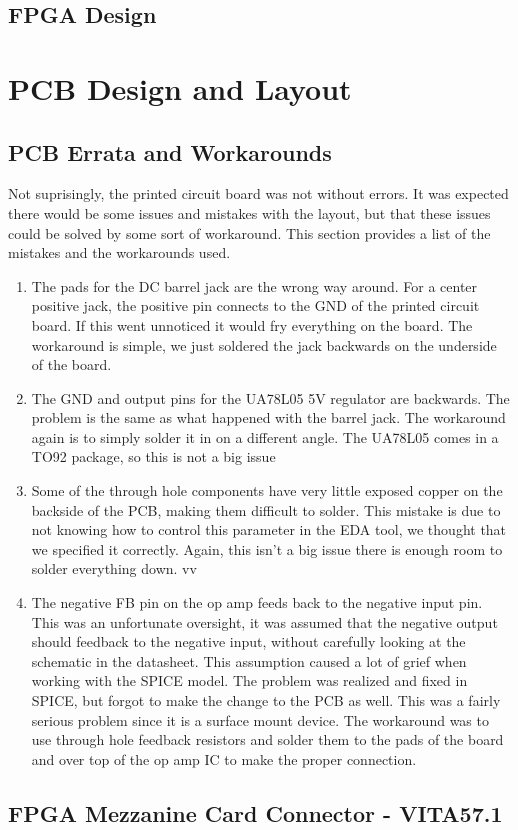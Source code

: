 \documentclass[a4paper, 12pt, notitlepage]{article}
\begin{document}
\subsection{FPGA Design}
\label{sec:fpga_system}

\section{PCB Design and Layout}
\label{sec:pcb_errata}
\subsection{PCB Errata and Workarounds}
Not suprisingly, the printed circuit board was not without errors.  It was expected there would be some issues and mistakes with the layout, but that these issues could be solved by some sort of workaround.  This section provides a list of the mistakes and the workarounds used.

\begin{enumerate}
  \item{
    The pads for the DC barrel jack are the wrong way around.  For a center positive jack, the positive pin connects to the GND of the printed circuit board.  If this went unnoticed it would fry everything on the board.  The workaround is simple, we just soldered the jack backwards on the underside of the board.
  }

  \item{
    The GND and output pins for the UA78L05 5V regulator are backwards.  The problem is the same as what happened with the barrel jack.  The workaround again is to simply solder it in on a different angle.  The UA78L05 comes in a TO92 package, so this is not a big issue
  }

  \item{
    Some of the through hole components have very little exposed copper on the backside of the PCB, making them difficult to solder.  This mistake is due to not knowing how to control this parameter in the EDA tool, we thought that we specified it correctly.  Again, this isn't a big issue there is enough room to solder everything down.
    }
vv
  \item{ %
    The negative FB pin on the op amp feeds back to the negative input pin.  This was an unfortunate oversight, it was assumed that the negative output should feedback to the negative input, without carefully looking at the schematic in the datasheet.  This assumption caused a lot of grief when working with the SPICE model.  The problem was realized and fixed in SPICE, but forgot to make the change to the PCB as well.  This was a fairly serious problem since it is a surface mount device.  The workaround was to use through hole feedback resistors and solder them to the pads of the board and over top of the op amp IC to make the proper connection.
  }

\end{enumerate}

\subsection{FPGA Mezzanine Card Connector - VITA57.1}

\clearpage


\end{document}
